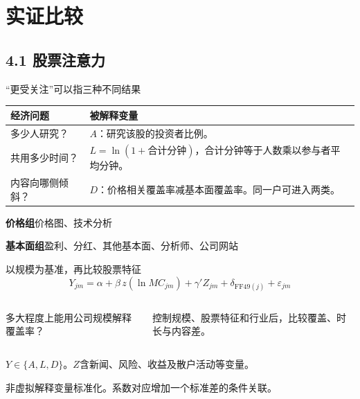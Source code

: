 \section{实证比较}
\subsection{4.1 股票注意力}
\begin{frame}{“更受关注”可以指三种不同结果}
  \begin{tabularx}{\linewidth}{@{}L{.25\linewidth}Y@{}}
    \toprule
    \textbf{经济问题} & \textbf{被解释变量}\\
    \midrule
    多少人研究？ & $A$：研究该股的投资者比例。\\
    共用多少时间？ & $L=\ln(1+\text{合计分钟})$，合计分钟等于人数乘以参与者平均分钟。\\
    内容向哪侧倾斜？ & $D$：价格相关覆盖率减基本面覆盖率。同一户可进入两类。\\
    \bottomrule
  \end{tabularx}
  \smallskip
  {\small
     \textbf{价格组}\quad 价格图、技术分析\par
     \textbf{基本面组}\quad 盈利、分红、其他基本面、分析师、公司网站}
\end{frame}

\begin{frame}{以规模为基准，再比较股票特征}
  \[
    Y_{jm}=\alpha+\beta\,z(\ln MC_{jm})
      +\gamma'Z_{jm}+\delta_{\mathrm{FF49}(j)}+\varepsilon_{jm}
  \]
  \begin{columns}[T,onlytextwidth]
      \par
      多大程度上能用公司规模解释覆盖率？
      \par
      控制规模、股票特征和行业后，比较覆盖、时长与内容差。
  \end{columns}
  \medskip
  {\small $Y\in\{A,L,D\}$。$Z$含新闻、风险、收益及散户活动等变量。\par
  非虚拟解释变量标准化。系数对应增加一个标准差的条件关联。}
\end{frame}

